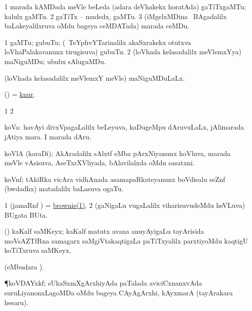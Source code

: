 \bentry
{}
\gl{\nA}
\bmng
\bnum
\num{1} marada kAMDada meVle beLeda (adara deVhakekx horatAda) gaTiTxgaMTu; kalulx gaMTu. 
\num{2} gaTiTx -- mudedx, gaMTu. 
\num{3} (iMgelxMDina \kanu\ BAgadalilx baLakeyalilxruva oMdu bageya ceMDATada) marada ceMDu. 
\enum
\emng
\eentry

\bentry
{}
\gl{\nA}
\bmng
\bnum
\num{1} gaMTu; gubuTu; (\kanmu\ TeYpfreYTarinalilx akaSxrakekx otutxva loVhaPalakavanunx tirugisuva) gubuTu. 
\num{2} (loVhada kelasadalilx meVlemxYya) maNiguMDu; ububx sAluguMDu. 
\enum
\emng
\eentry

\bentry
{}
\gl{\gu}
\bmng
(loVhada kelasadalilx meVlemxY meVle) maNiguMDuLaLx. 
\emng
\eentry

\bentry
{}
\gl{\nA}
\bmng
(\birx)  = \hyperlink{knur}{knur}. 
\emng
\eentry

\bentry
{}
\gl{\saMkiSx}
\bmng
\bnum
\num{1}  
\num{2}  
\enum
\emng
\eentry

\bentry
{}
\gl{\nA}
\bmng
koVa: 
\banum
{} havAyi divxVpagaLalilx beLeyuva, kaDugeMpu dAruvuLaLx, jAlimarada jAtiya mara. 
 I marada dAru. 
\eanum
\emng
\eentry

\bentry
{}
\gl{\nA}
\bmng
koVlA (karaDi); AkAradalilx sAlxtf eMba pArxNiyanunx hoVluva, marada meVle vAsisuva, AseTxrXVliyada, bAlavilalxda oMdu sasatxni. 
\emng
\eentry

\bentry
{}
\gl{\nA}
\bmng
koVnf; tAkiRka vicAra vidhAnada asamapaRkateyanunx boVdisalu seZnf (bwdadhx) matadalilx baLasuva ogaTu. 
\emng
\eentry

\bentry
{}
\gl{\nA}
\bmng
\bnum
\num{1} (jamaRnf \pu) = \hyperref{kandict_b.pdf}{B}{brownie}{brownie(1)}. 
\num{2} (gaNigaLu \mo vugaLalilx viharisuvudeMdu heVLuva) BUgata BUta. 
\enum
\emng
\eentry

\bentry
{}
\gl{\nA}
\bmng
(\saM) kaKalf saMKeyx; kaKalf matutx avana anuyAyigaLu tayArisida moVsAZTfRna samagarx saMgiVtakaqtigaLa paTiTxyalilx parxtiyoMdu kaqtigU koTiTxruva saMKeyx. 
\emng
\eentry

\bentry
{}
\gl{\gu}
\bmng
{} (eMbudara \saMkiSx). 
\emng
\eentry

\bentry
{}
\gl{\nA}
\bmng
\P koVDAYxkf; sUkaSxmXgArxhiyAda paTalada aviciCxnanxvAda suruLiyanonxLagoMDa oMdu bageya CAyAgArxhi, kAyxmarA (tayArakara hesaru). 
\emng
\eentry

